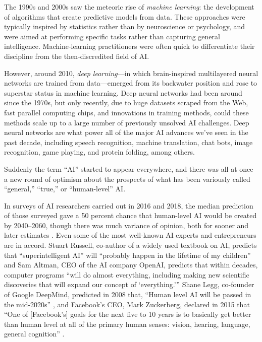 \documentclass[12pt]{article}
\begin{document}
The 1990s and 2000s saw the meteoric rise of \textit{machine learning}: the development of algorithms that create predictive models from data.  These approaches were typically inspired by statistics rather than by neuroscience or psychology, and were aimed at performing specific tasks rather than capturing general intelligence.  Machine-learning practitioners were often quick to differentiate their discipline from the then-discredited field of AI.  

However, around 2010, \textit{deep learning}---in which brain-inspired multilayered neural networks are trained from data---emerged from its backwater position and rose to superstar status in machine learning. Deep neural networks had been around since the 1970s, but only recently, due to huge datasets scraped from the Web, fast parallel computing chips, and innovations in training methods, could these methods scale up to a large number of previously unsolved AI challenges.  Deep neural networks are what power all of the major AI advances we've seen in the past decade, including speech recognition, machine translation, chat bots, image recognition, game playing, and protein folding, among others.

Suddenly the term ``AI'' started to appear everywhere, and there was all at once a new round of optimism about the prospects of what has been variously called ``general,'' ``true,'' or ``human-level'' AI.   

In surveys of AI researchers carried out in 2016 and 2018, the median prediction of those surveyed gave a 50 percent chance that human-level AI would be created by 2040–2060, though there was much variance of opinion, both for sooner and later estimates \cite{Muller2016,Grace2018}. Even some of the most well-known AI experts and entrepreneurs are in accord.  Stuart Russell, co-author of a widely used textbook on AI, predicts that ``superintelligent AI'' will ``probably happen in the lifetime of my children'' \cite{Russell2019} and Sam Altman, CEO of the AI company OpenAI, predicts that within decades, computer programs ``will do almost everything, including making new scientific discoveries that will expand our concept of `everything.'\thinspace'' \cite{Altman2021} Shane Legg, co-founder of Google DeepMind, predicted in 2008 that, ``Human level AI will be passed in the mid-2020s'' \cite{Despres2008}, and Facebook's CEO, Mark Zuckerberg, declared in 2015 that ``One of [Facebook's] goals for the next five to 10 years is to basically get better than human level at all of the primary human senses: vision, hearing, language, general cognition'' \cite{McCracken2015}.
\end{document}

